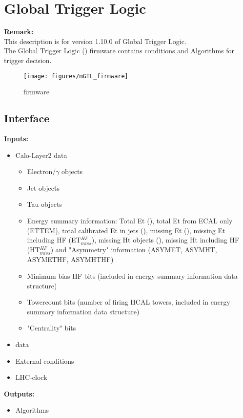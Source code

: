 \section{Global Trigger Logic}
\label{sec:gtl:global_trigger_logic}
\textbf{Remark:}\\
This description is for version 1.10.0 of Global Trigger Logic.\\

The Global Trigger Logic (\ugtl) firmware contains conditions and Algorithms for trigger decision.

\begin{figure}[htb]
\centering
\texttt{[image: figures/mGTL\_firmware]}
\caption{\ugtl firmware} 
\label{fig:gtl:mGTL_firmware}
\end{figure}

\subsection{\ugtl Interface}
\label{sec:gtl:ugtl_interface}

\textbf{Inputs:}
\begin{itemize}
\item Calo-Layer2 data
\begin{itemize}
\item Electron/$\gamma$ objects
\item Jet objects
\item Tau objects
\item Energy summary information: Total Et (\ett), total Et from ECAL only (ETTEM), total calibrated Et in jets (\htt), missing Et (\etm), missing Et including HF (ET$_{miss}^{HF}$), missing Ht objects (\htm),
missing Ht including HF (HT$_{miss}^{HF}$) and "Asymmetry" information (ASYMET, ASYMHT, ASYMETHF, ASYMHTHF) 
\item Minimum bias HF bits (included in energy summary information data structure)
\item Towercount bits (number of firing HCAL towers, included in energy summary information data structure)
\item "Centrality" bits
\end{itemize}
\item \gmt data
\item External conditions
\item LHC-clock 
\end{itemize}
\textbf{Outputs:}
\begin{itemize}
\item Algorithms
\end{itemize}

